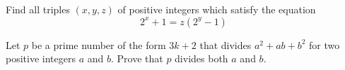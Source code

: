 \documentclass{subfile}
\begin{document}

	\begin{problem}
		Find all triples $(x,y,z)$ of positive integers which satisfy the equation $$2^x+1=z(2^y-1)$$ %
	\end{problem}



	\begin{problem}
		Let $p$ be a prime number of the form $3k+2$ that divides $a^2+ab+b^2$ for two positive integers $a$ and $b$. Prove that $p$ divides both $a$ and $b$. %
	\end{problem}

\end{document}
